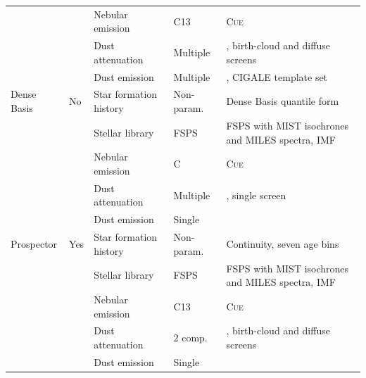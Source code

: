 \begin{table}[!t]
\begin{tabular}{@{}lllll@{}}
 &  & Nebular emission & C13 & \parbox[t]{5.4cm}{\raggedright \textsc{Cue} \citep{Li_2025}} \\
 &  & Dust attenuation & Multiple & \parbox[t]{5.4cm}{\raggedright \citet{Leitherer_2002}, birth-cloud and diffuse screens} \\
 &  & Dust emission & Multiple & \parbox[t]{5.4cm}{\raggedright \citet{Dale_2014}, CIGALE template set} \\
\midrule
Dense Basis & No & Star formation history & Non-param. & \parbox[t]{5.4cm}{\raggedright Dense Basis quantile form \citep{Iyer_2019}} \\
 &  & Stellar library & FSPS & \parbox[t]{5.4cm}{\raggedright FSPS with MIST isochrones and MILES spectra, \citet{Chabrier_2003} IMF} \\
 &  & Nebular emission & C & \parbox[t]{5.4cm}{\raggedright \textsc{Cue} \citep{Li_2025}} \\
 &  & Dust attenuation & Multiple & \parbox[t]{5.4cm}{\raggedright \citet{Calzetti_2000}, single screen} \\
 &  & Dust emission & Single & \parbox[t]{5.4cm}{\raggedright \citet{Draine_2007}} \\
\midrule
Prospector & Yes & Star formation history & Non-param. & \parbox[t]{5.4cm}{\raggedright Continuity, seven age bins} \\
 &  & Stellar library & FSPS & \parbox[t]{5.4cm}{\raggedright FSPS with MIST isochrones and MILES spectra, \citet{Chabrier_2003} IMF} \\
 &  & Nebular emission & C13 & \parbox[t]{5.4cm}{\raggedright \textsc{Cue} \citep{Li_2025}} \\
 &  & Dust attenuation & 2 comp. & \parbox[t]{5.4cm}{\raggedright \citet{Calzetti_2000}, birth-cloud and diffuse screens} \\
 &  & Dust emission & Single & \parbox[t]{5.4cm}{\raggedright \citet{Draine_2007}} \\
\bottomrule
\end{tabular}
\end{table}

